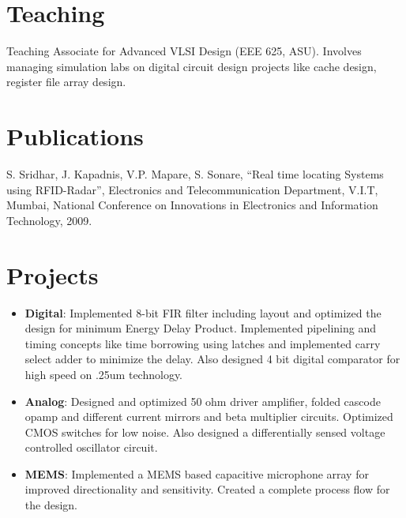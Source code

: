 \documentclass[margin]{res}
\begin{document}
\begin{resume}
\section{Teaching}
Teaching Associate for Advanced VLSI Design (EEE 625, ASU). Involves managing simulation labs on digital circuit design projects like cache design, register file array design.
\section{Publications}
S. Sridhar, J. Kapadnis, V.P. Mapare, S. Sonare, ``Real time locating Systems using RFID-Radar'', Electronics and Telecommunication Department, V.I.T, Mumbai, National Conference on Innovations in Electronics and Information Technology, 2009.

\section{Projects}
\begin{itemize}
\item
{\bf Digital}:  Implemented 8-bit FIR filter including layout and optimized the design for minimum Energy Delay Product. Implemented pipelining and timing concepts like time borrowing using latches and implemented carry select adder to minimize the delay. Also designed 4 bit digital comparator for high speed on .25um technology.
\item
{\bf Analog}: Designed and optimized 50 ohm driver amplifier, folded cascode opamp and different current mirrors and beta multiplier circuits. Optimized CMOS switches for low noise. Also designed a differentially sensed voltage controlled oscillator circuit.
\item
{\bf MEMS}: Implemented a MEMS based capacitive microphone array for improved directionality and sensitivity. Created a complete process flow for the design.
\end{itemize}

\end{resume}
\end{document}
